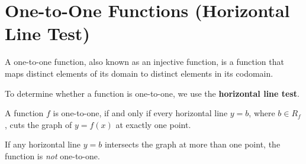 \documentclass[11pt,a4paper]{book}
\begin{document}
\newpage

\section{One-to-One Functions (Horizontal Line Test)}

A one-to-one function, also known as an injective function, is a function that maps distinct elements of its domain to distinct elements in its codomain.

To determine whether a function is one-to-one, we use the \textbf{horizontal line test}.

\medskip{}

\begin{tcolorbox}[colback=blue!5, colframe=black,boxrule=.4pt, sharpish corners]

A function $f$ is one-to-one, if and only if every horizontal line $y=b$,
where $b\in R_{f}$, cuts the graph of $y=f(x)$ at exactly one point.

\end{tcolorbox}

 If any horizontal line $y=b$ intersects the graph at more than one point, the function is \textit{not} one-to-one.
\end{document}
